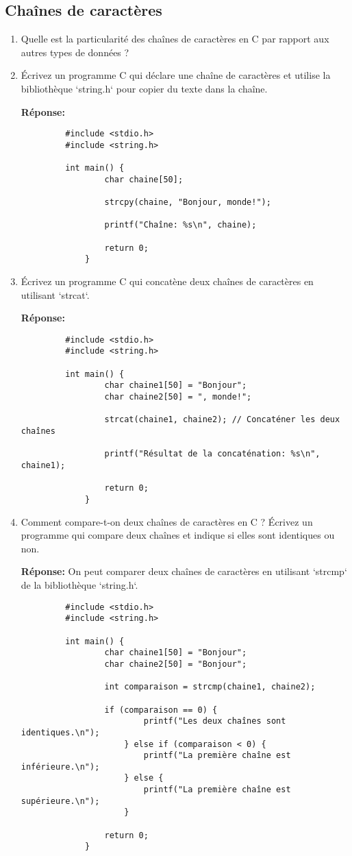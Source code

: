 \subsection{Chaînes de caractères}
\begin{enumerate}
	\item Quelle est la particularité des chaînes de caractères en C par rapport aux autres types de données ?
	\item Écrivez un programme C qui déclare une chaîne de caractères et utilise la bibliothèque `string.h` pour copier du texte dans la chaîne.
	
	 \textbf{Réponse:}
	 
	 \begin{lstlisting}
		 #include <stdio.h>
		 #include <string.h>
		
		 int main() {
			     char chaine[50];
			
			     strcpy(chaine, "Bonjour, monde!");
			
			     printf("Chaîne: %s\n", chaine);
			
			     return 0;
			 }
		 \end{lstlisting}
	
	\item Écrivez un programme C qui concatène deux chaînes de caractères en utilisant `strcat`.
	
	 \textbf{Réponse:}
	 \begin{lstlisting}
		 #include <stdio.h>
		 #include <string.h>
		
		 int main() {
			     char chaine1[50] = "Bonjour";
			     char chaine2[50] = ", monde!";
			
			     strcat(chaine1, chaine2); // Concaténer les deux chaînes
			
			     printf("Résultat de la concaténation: %s\n", chaine1);
			
			     return 0;
			 }
 \end{lstlisting}
	
	\item Comment compare-t-on deux chaînes de caractères en C ? Écrivez un programme qui compare deux chaînes et indique si elles sont identiques ou non.

	 \textbf{Réponse:}
	 On peut comparer deux chaînes de caractères en utilisant `strcmp` de la bibliothèque `string.h`.
	 \begin{lstlisting}
		 #include <stdio.h>
		 #include <string.h>
		
		 int main() {
			     char chaine1[50] = "Bonjour";
			     char chaine2[50] = "Bonjour";
			
			     int comparaison = strcmp(chaine1, chaine2);
			
			     if (comparaison == 0) {
				         printf("Les deux chaînes sont identiques.\n");
				     } else if (comparaison < 0) {
				         printf("La première chaîne est inférieure.\n");
				     } else {
				         printf("La première chaîne est supérieure.\n");
				     }
			
			     return 0;
			 }
		 \end{lstlisting}
\end{enumerate}

